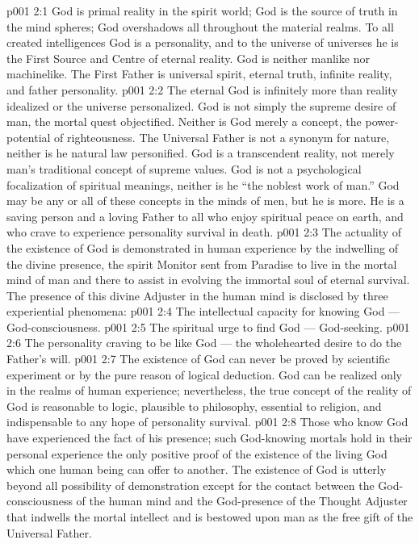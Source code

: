 \vs p001 2:1 God is primal reality in the spirit world; God is the source of truth in the mind spheres; God overshadows all throughout the material realms. To all created intelligences God is a personality, and to the universe of universes he is the First Source and Centre of eternal reality. God is neither manlike nor machinelike. The First Father is universal spirit, eternal truth, infinite reality, and father personality.
\vs p001 2:2 \pc The eternal God is infinitely more than reality idealized or the universe personalized. God is not simply the supreme desire of man, the mortal quest objectified. Neither is God merely a concept, the power\hyp{}potential of righteousness. The Universal Father is not a synonym for nature, neither is he natural law personified. God is a transcendent reality, not merely man’s traditional concept of supreme values. God is not a psychological focalization of spiritual meanings, neither is he “the noblest work of man.” God may be any or all of these concepts in the minds of men, but he is more. He is a saving person and a loving Father to all who enjoy spiritual peace on earth, and who crave to experience personality survival in death.
\vs p001 2:3 \pc The actuality of the existence of God is demonstrated in human experience by the indwelling of the divine presence, the spirit Monitor sent from Paradise to live in the mortal mind of man and there to assist in evolving the immortal soul of eternal survival. The presence of this divine Adjuster in the human mind is disclosed by three experiential phenomena:
\vs p001 2:4 \bibnobreakspace The intellectual capacity for knowing God --- God\hyp{}consciousness.
\vs p001 2:5 \bibnobreakspace The spiritual urge to find God --- God\hyp{}seeking.
\vs p001 2:6 \bibnobreakspace The personality craving to be like God --- the wholehearted desire to do the Father’s will.
\vs p001 2:7 \pc The existence of God can never be proved by scientific experiment or by the pure reason of logical deduction. God can be realized only in the realms of human experience; nevertheless, the true concept of the reality of God is reasonable to logic, plausible to philosophy, essential to religion, and indispensable to any hope of personality survival.
\vs p001 2:8 Those who know God have experienced the fact of his presence; such God\hyp{}knowing mortals hold in their personal experience the only positive proof of the existence of the living God which one human being can offer to another. The existence of God is utterly beyond all possibility of demonstration except for the contact between the God\hyp{}consciousness of the human mind and the God\hyp{}presence of the Thought Adjuster that indwells the mortal intellect and is bestowed upon man as the free gift of the Universal Father.
